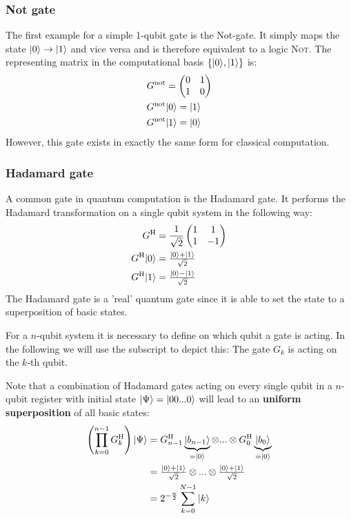 \documentclass[bibliography=totocnumbered]{article}
\theoremstyle{NoticeStyle}
\begin{document}
\subsubsection{Not gate}
The first example for a simple 1-qubit gate is the Not-gate. It simply maps the state ${\left\vert{0}\right\rangle}\rightarrow{\left\vert{1}\right\rangle}$ and vice versa and is therefore equivalent to a logic \textsc{Not}. The representing matrix in the computational basis $\{{\left\vert{0}\right\rangle}, {\left\vert{1}\right\rangle}\}$ is:
%
\begin{align}
	& G^\text{not} =
	\begin{pmatrix}
		0 & 1\\
		1 & 0
	\end{pmatrix}\\
	& G^\text{not} {\left\vert{0}\right\rangle} = {\left\vert{1}\right\rangle}\\
	& G^\text{not} {\left\vert{1}\right\rangle} = {\left\vert{0}\right\rangle}
\end{align}
%
However, this gate exists in exactly the same form for classical computation.

\subsubsection{Hadamard gate}
A common gate in quantum computation is the Hadamard gate. It performs the Hadamard transformation on a single qubit system in the following way:
%
\begin{align}
	G^\text{H} & = 
		\frac{1}{\sqrt{2}}
		\begin{pmatrix}
			1 & 1\\
			1 & -1
		\end{pmatrix}\\
	G^\text{H} {\left\vert{0}\right\rangle} & = \tfrac{{\left\vert{0}\right\rangle} + {\left\vert{1}\right\rangle}}{\sqrt{2}}\\
	G^\text{H} {\left\vert{1}\right\rangle} & = \tfrac{{\left\vert{0}\right\rangle} - {\left\vert{1}\right\rangle}}{\sqrt{2}}
\end{align}
%
The Hadamard gate is a 'real' quantum gate since it is able to set the state to a superposition of basic states.

For a $n$-qubit system it is necessary to define on which qubit a gate is acting. In the following we will use the subscript to depict this: The gate $G_k$ is acting on the $k$-th qubit.

Note that a combination of Hadamard gates acting on every single qubit in a $n$-qubit register with initial state ${\left\vert{\Psi}\right\rangle}={\left\vert{00...0}\right\rangle}$ will lead to an \textbf{uniform superposition} of all basic states:
%
\begin{align}
	\left(  \prod_{k=0}^{n-1} G^\text{H}_k  \right) {\left\vert{\Psi}\right\rangle}
	&= G^\text{H}_{n-1} \underbrace{{\left\vert{b_{n-1}}\right\rangle}}_{={\left\vert{0}\right\rangle}} \otimes ... \otimes G^\text{H}_{0} \underbrace{{\left\vert{b_{0}}\right\rangle}}_{={\left\vert{0}\right\rangle}}\\
	&= \tfrac{{\left\vert{0}\right\rangle} + {\left\vert{1}\right\rangle}}{\sqrt{2}} \otimes ... \otimes \tfrac{{\left\vert{0}\right\rangle} + {\left\vert{1}\right\rangle}}{\sqrt{2}}\\
	&= 2^{-\frac{n}{2}} \sum_{k=0}^{N-1} {\left\vert{k}\right\rangle}
\end{align}
%
\end{document}
